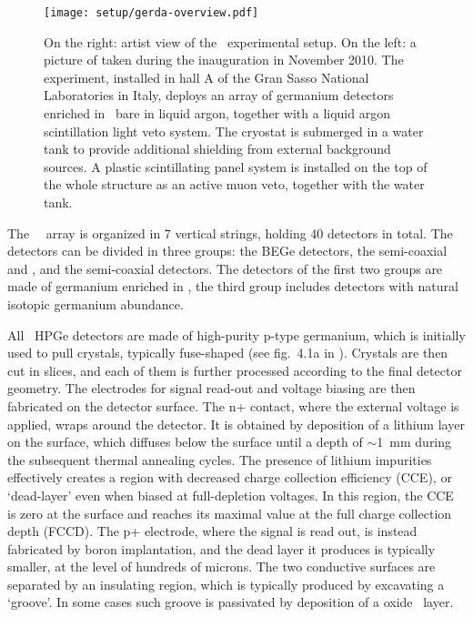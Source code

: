 \begin{figure}
  \centering
  \texttt{[image: setup/gerda-overview.pdf]}
  \caption{%
    On the right: artist view of the \gerda\ experimental setup. On the left: a picture of
    taken during the inauguration in November 2010. The experiment, installed in hall A of
    the Gran Sasso National Laboratories in Italy, deploys an array of germanium detectors
    enriched in \gesix\ bare in liquid argon, together with a liquid argon scintillation
    light veto system. The cryostat is submerged in a water tank to provide additional
    shielding from external background sources. A plastic scintillating panel system is
    installed on the top of the whole structure as an active muon veto, together with the
    water tank.
  }\label{fig:setup:artistview}
\end{figure}

The \gerda\ \phasetwo\ array is organized in 7 vertical strings, holding 40 detectors in
total. The detectors can be divided in three groups: the BEGe detectors, the semi-coaxial
 and , and the semi-coaxial  detectors. The detectors of the first two
groups are made of germanium enriched in \gesix, the third group includes detectors with
natural isotopic germanium abundance.

All \gerda\ HPGe detectors are made of high-purity p-type germanium, which is initially
used to pull crystals, typically fuse-shaped (see fig.~4.1a in \cite{Yonenaga2019}).
Crystals are then cut in slices, and each of them is further processed according to the
final detector geometry. The electrodes for signal read-out and voltage biasing are then
fabricated on the detector surface. The n+ contact, where the external voltage is applied,
wraps around the detector. It is obtained by deposition of a lithium layer on the surface,
which diffuses below the surface until a depth of $\sim$1~mm during the subsequent thermal
annealing cycles. The presence of lithium impurities effectively creates a region with
decreased charge collection efficiency (CCE), or `dead-layer' even when biased at
full-depletion voltages.  In this region, the CCE is zero at the surface and reaches its
maximal value at the full charge collection depth (FCCD). The p+ electrode, where the
signal is read out, is instead fabricated by boron implantation, and the dead layer it
produces is typically smaller, at the level of hundreds of microns. The two conductive
surfaces are separated by an insulating region, which is typically produced by excavating
a `groove'. In some cases such groove is passivated by deposition of a oxide \fillme\
layer.

